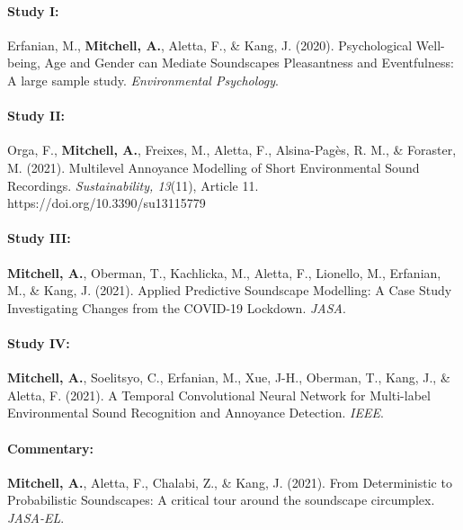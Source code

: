 \documentclass[twoside,fontsize=12pt,titlepage]{scrbook}
\begin{document}

\paragraph*{Study I:    }
Erfanian, M., \textbf{Mitchell, A.}, Aletta, F., \& Kang, J. (2020). Psychological Well-being, Age and Gender can Mediate Soundscapes Pleasantness and Eventfulness: A large sample study. \emph{Environmental Psychology}.

\paragraph*{Study II:   }
Orga, F., \textbf{Mitchell, A.}, Freixes, M., Aletta, F., Alsina-Pagès, R. M., \& Foraster, M. (2021). Multilevel Annoyance Modelling of Short Environmental Sound Recordings. \emph{Sustainability, 13}(11), Article 11. https://doi.org/10.3390/su13115779

\paragraph*{Study III:  }
\textbf{Mitchell, A.}, Oberman, T., Kachlicka, M., Aletta, F., Lionello, M., Erfanian, M., \& Kang, J. (2021). Applied Predictive Soundscape Modelling: A Case Study Investigating Changes from the COVID-19 Lockdown. \emph{JASA}.

\paragraph*{Study IV:   }
\textbf{Mitchell, A.}, Soelitsyo, C., Erfanian, M., Xue, J-H., Oberman, T., Kang, J., \& Aletta, F. (2021). A Temporal Convolutional Neural Network for Multi-label Environmental Sound Recognition and Annoyance Detection. \emph{IEEE}.

\paragraph*{Commentary: }
\textbf{Mitchell, A.}, Aletta, F., Chalabi, Z., \& Kang, J. (2021). From Deterministic to Probabilistic Soundscapes: A critical tour around the soundscape circumplex. \emph{JASA-EL}.
\end{document}
